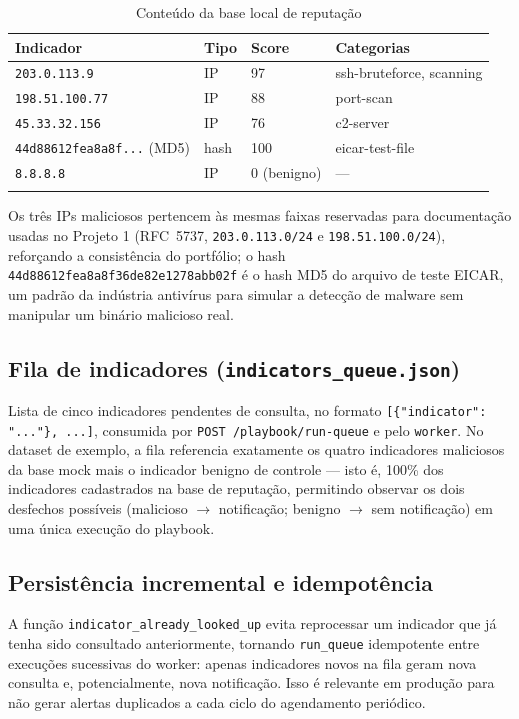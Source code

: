 \documentclass[11pt,a4paper]{article}
\begin{document}
\begin{longtable}{p{4.2cm}p{1.8cm}p{1.4cm}p{5.5cm}}
\toprule
\textbf{Indicador} & \textbf{Tipo} & \textbf{Score} & \textbf{Categorias} \\
\midrule
\endhead
\texttt{203.0.113.9} & IP & 97 & ssh-bruteforce, scanning \\
\texttt{198.51.100.77} & IP & 88 & port-scan \\
\texttt{45.33.32.156} & IP & 76 & c2-server \\
\texttt{44d88612fea8a8f...} (MD5) & hash & 100 & eicar-test-file \\
\texttt{8.8.8.8} & IP & 0 (benigno) & --- \\
\bottomrule
\caption{Conteúdo da base local de reputação}
\end{longtable}

Os três IPs maliciosos pertencem às mesmas faixas reservadas para documentação usadas
no Projeto 1 (RFC~5737, \texttt{203.0.113.0/24} e \texttt{198.51.100.0/24}), reforçando
a consistência do portfólio; o hash \texttt{44d88612fea8a8f36de82e1278abb02f} é o
hash MD5 do arquivo de teste EICAR, um padrão da indústria antivírus para simular a
detecção de malware sem manipular um binário malicioso real.

\subsection{Fila de indicadores (\texttt{indicators\_queue.json})}

Lista de cinco indicadores pendentes de consulta, no formato
\texttt{[\{"indicator": "..."\}, ...]}, consumida por \texttt{POST /playbook/run-queue}
e pelo \texttt{worker}. No dataset de exemplo, a fila referencia exatamente os quatro
indicadores maliciosos da base mock mais o indicador benigno de controle --- isto é,
100\% dos indicadores cadastrados na base de reputação, permitindo observar os dois
desfechos possíveis (malicioso $\rightarrow$ notificação; benigno $\rightarrow$ sem
notificação) em uma única execução do playbook.

\subsection{Persistência incremental e idempotência}

A função \texttt{indicator\_already\_looked\_up} evita reprocessar um indicador que já
tenha sido consultado anteriormente, tornando \texttt{run\_queue} idempotente entre
execuções sucessivas do worker: apenas indicadores novos na fila geram nova consulta e,
potencialmente, nova notificação. Isso é relevante em produção para não gerar alertas
duplicados a cada ciclo do agendamento periódico.
\end{document}
